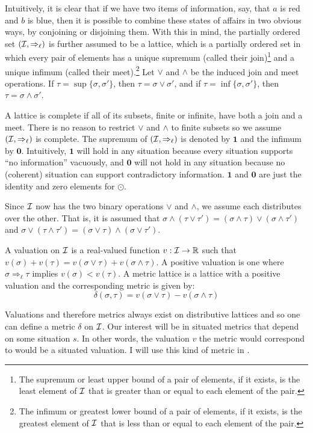 Intuitively, it is clear that if we have two items of information, say, that $a$ is red and $b$ is blue, then it is possible to combine these states of affairs in two obvious ways, by conjoining or disjoining them. With this in mind, the partially ordered set $({\cal I}, \Rightarrow_\ell)$ is further assumed to be a lattice, which is a partially ordered set in which every pair of elements has a unique supremum (called their join)\footnote{The supremum or least upper bound of a pair of elements, if it exists, is the least element of $\cal I$ that is greater than or equal to each element of the pair.} and a unique infimum (called their meet).\footnote{The infimum or greatest lower bound of a pair of elements, if it exists, is the greatest element of $\cal I$ that is less than or equal to each element of the pair.} Let $\vee$ and $\wedge$ be the induced join and meet operations. If $\tau = \sup\{\sigma,\sigma'\}$, then $\tau = \sigma \vee \sigma'$, and if $\tau = \inf\{\sigma,\sigma'\}$, then $\tau = \sigma \wedge \sigma'$. 

A lattice is complete if all of its subsets, finite or infinite, have both a join and a meet. There is no reason to restrict $\vee$ and $\wedge$ to finite subsets so we assume $({\cal I}, \Rightarrow_\ell)$ is complete. The supremum of $({\cal I}, \Rightarrow_\ell)$ is denoted by $\mathbf{1}$ and the infimum by $\mathbf{0}$.  Intuitively, $\mathbf{1}$ will hold in any situation because every situation supports ``no information'' vacuously, and $\mathbf{0}$ will not hold in any situation because no (coherent) situation can support contradictory information. $\mathbf{1}$ and $\mathbf{0}$ are just the identity and zero elements for $\odot$.

Since $\cal I$ now has the two binary operations $\vee$ and $\wedge$, we assume each distributes over the other. That is, it is assumed that $\sigma \wedge (\tau \vee \tau') = (\sigma \wedge \tau) \vee (\sigma \wedge \tau')$ and $\sigma \vee (\tau \wedge \tau') = (\sigma \vee \tau) \wedge (\sigma \vee \tau')$.

A valuation on $\cal I$ is a real-valued function $v: {\cal I} \rightarrow \mathbb{R}$ such that $v(\sigma) + v(\tau) = v(\sigma \vee \tau) + v(\sigma \wedge \tau)$. A positive valuation is one where $\sigma \Rightarrow_\ell \tau$ implies $v(\sigma) < v(\tau)$. A metric lattice is a lattice with a positive valuation and the corresponding metric is given by:
\[ \delta(\sigma, \tau) = v(\sigma \vee \tau) - v(\sigma \wedge \tau) \]

\noindent Valuations and therefore metrics always exist on distributive lattices and so one can define a metric $\delta$ on $\cal I$. Our interest will be in situated metrics that depend on some situation $s$. In other words, the valuation $v$ the metric would correspond to would be a situated valuation. I will use this kind of metric in .

